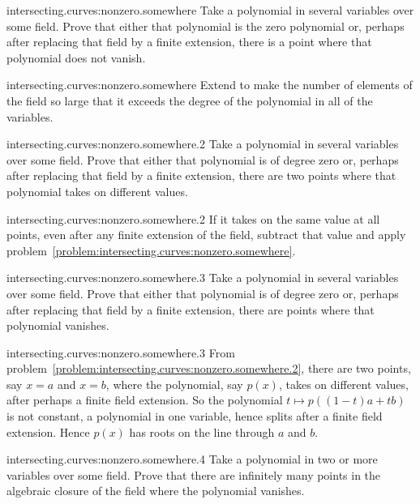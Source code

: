 \begin{problem}{intersecting.curves:nonzero.somewhere}
Take a polynomial in several variables over some field.
Prove that either that polynomial is the zero polynomial or, perhaps after replacing that field by a finite extension, there is a point where that polynomial does not vanish.
\end{problem}
\begin{answer}{intersecting.curves:nonzero.somewhere}
Extend to make the number of elements of the field so large that it exceeds the degree of the polynomial in all of the variables.
\end{answer}
\begin{problem}{intersecting.curves:nonzero.somewhere.2}
Take a polynomial in several variables over some field.
Prove that either that polynomial is of degree zero or, perhaps after replacing that field by a finite extension, there are two points where that polynomial takes on different values.
\end{problem}
\begin{answer}{intersecting.curves:nonzero.somewhere.2}
If it takes on the same value at all points, even after any finite extension of the field, subtract that value and apply problem~\vref{problem:intersecting.curves:nonzero.somewhere}.
\end{answer}
\begin{problem}{intersecting.curves:nonzero.somewhere.3}
Take a polynomial in several variables over some field.
Prove that either that polynomial is of degree zero or, perhaps after replacing that field by a finite extension, there are points where that polynomial vanishes.
\end{problem}
\begin{answer}{intersecting.curves:nonzero.somewhere.3}
From problem~\vref{problem:intersecting.curves:nonzero.somewhere.2}, there are two points, say \(x=a\) and \(x=b\), where the polynomial, say \(p(x)\), takes on different values, after perhaps a finite field extension.
So the polynomial \(t\mapsto p((1-t)a+tb)\) is not constant, a polynomial in one variable, hence splits after a finite field extension.
Hence \(p(x)\) has roots on the line through \(a\) and \(b\).
\end{answer}
\begin{problem}{intersecting.curves:nonzero.somewhere.4}
Take a polynomial in two or more variables over some field.
Prove that there are infinitely many points in the algebraic closure of the field where the polynomial vanishes.
\end{problem}
